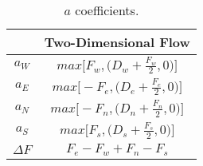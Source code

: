 \begin{table}[htbp]
  \centering
  \caption{$a$ coefficients.}
  \label{tab:coefsa}
    \begin{tabular}{|c|c|}
      \hline
      \rule{0pt}{2ex}
         & Two-Dimensional Flow 
    \\
    \hline
	\rule{0pt}{4ex}  
    $a_W$  & $max\bigg[F_w, \bigg(D_w+\frac{F_w}{2},0\bigg)\bigg]$ \\ [2ex]
    \hline
	\rule{0pt}{4ex}  
	$a_E$   &$max\bigg[-F_e, \bigg(D_e+\frac{F_e}{2},0\bigg)\bigg]$ \\ [2ex]
	\hline
	\rule{0pt}{4ex}  
	$a_N$  &$max\bigg[-F_n, \bigg(D_n+\frac{F_n}{2},0\bigg)\bigg]$ \\ [2ex]
	\hline
	\rule{0pt}{4ex}  
	$a_S$  &$max\bigg[F_s, \bigg(D_s+\frac{F_s}{2},0\bigg)\bigg]$ \\ [2ex]
	\hline
	\rule{0pt}{4ex}  
	$\Delta F$   &$F_e-F_w+F_n-F_s$ \\ [2ex]
    \hline
    
    \end{tabular}
\end{table}

